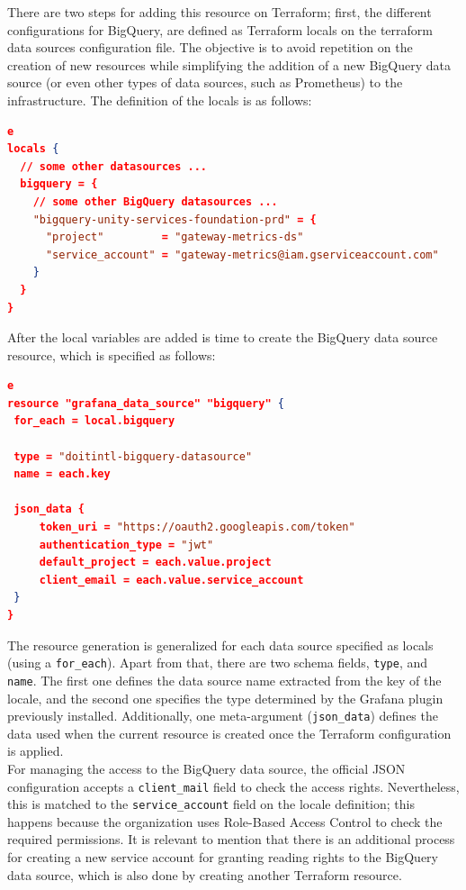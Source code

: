 \documentclass[english, 12pt, a4paper, sci, utf8, a-1b, online]{aaltothesis}
\begin{document}
There are two steps for adding this resource on Terraform; first, the different configurations for BigQuery, are defined as Terraform locals on the terraform data sources configuration file. The objective is to avoid repetition on the creation of new resources while simplifying the addition of a new BigQuery data source (or even other types of data sources, such as Prometheus) to the infrastructure. The definition of the locals is as follows:\\

\begin{lstlisting}[language=json,firstnumber=1]e
locals {
  // some other datasources ...
  bigquery = {
    // some other BigQuery datasources ...
    "bigquery-unity-services-foundation-prd" = {
      "project"         = "gateway-metrics-ds"
      "service_account" = "gateway-metrics@iam.gserviceaccount.com"
    }
  }
}
\end{lstlisting}

After the local variables are added is time to create the BigQuery data source resource, which is specified as follows:\\

\begin{lstlisting}[language=json,firstnumber=1]e
resource "grafana_data_source" "bigquery" {
 for_each = local.bigquery
 
 type = "doitintl-bigquery-datasource"
 name = each.key
 
 json_data {
     token_uri = "https://oauth2.googleapis.com/token"
     authentication_type = "jwt"
     default_project = each.value.project
     client_email = each.value.service_account
 }
}
\end{lstlisting}

The resource generation is generalized for each data source specified as locals (using a \texttt{for\_each}). Apart from that, there are two schema fields, \texttt{type}, and \texttt{name}. The first one defines the data source name extracted from the key of the locale, and the second one specifies the type determined by the Grafana plugin previously installed. Additionally, one meta-argument \cite{TerraformMeta} (\texttt{json\_data}) defines the data used when the current resource is created once the Terraform configuration is applied.\\

For managing the access to the BigQuery data source, the official JSON configuration accepts a \texttt{client\_mail} field to check the access rights. Nevertheless, this is matched to the \texttt{service\_account} field on the locale definition; this happens because the organization uses Role-Based Access Control to check the required permissions. It is relevant to mention that there is an additional process for creating a new service account for granting reading rights to the BigQuery data source, which is also done by creating another Terraform resource.
\end{document}
